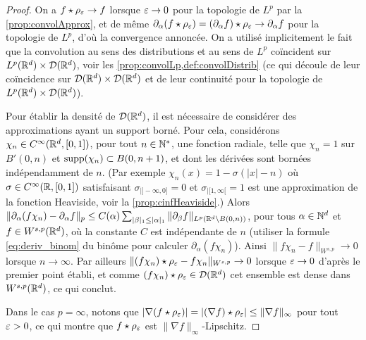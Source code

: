 \begin{proof}
	On a $f \star \rho_\varepsilon \to f$ lorsque $\varepsilon \to 0$ pour la topologie de $L^p$ par la \cref{prop:convolApprox}, et de même $\partial_\alpha (f \star \rho_\varepsilon) = (\partial_\alpha f) \star \rho_\varepsilon \to \partial_\alpha f$ pour la topologie de $L^p$, d'où la convergence annoncée. On a utilisé implicitement le fait que la convolution au sens des distributions et au sens de $L^p$ coïncident sur $L^p(\mathbb{R}^d) \times \mathcal{D}(\mathbb{R}^d)$, voir les \cref{prop:convolLp,def:convolDistrib} (ce qui découle de leur coïncidence sur $\mathcal{D}(\mathbb{R}^d)\times \mathcal{D}(\mathbb{R}^d)$ et de leur continuité pour la topologie de $L^p(\mathbb{R}^d) \times \mathcal{D}(\mathbb{R}^d)$).
	
	Pour établir la densité de $\mathcal{D}(\mathbb{R}^d)$, il est nécessaire de considérer des approximations ayant un support borné. Pour cela, considérons $\chi_n \in C^\infty (\mathbb{R}^d , [0,1])$, pour tout $n \in \mathbb{N}^*$, une fonction radiale, telle que $\chi_n = 1$ sur $B'(0,n)$ et $\operatorname{supp}(\chi_n) \subset B(0,n+1)$, et dont les dérivées sont bornées indépendamment de $n$. (Par exemple $\chi_n(x) = 1-\sigma(|x|-n)$ où $\sigma \in C^\infty( \mathbb{R} , [0,1])$ satisfaisant $\sigma_{|]-\infty,0]}=0$ et $\sigma_{|[1,\infty[} = 1$ est une approximation de la fonction Heaviside, voir la \cref{prop:cinfHeaviside}.) Alors $\|\partial_\alpha (f \chi_n) - \partial_\alpha f\|_p \leq C(\alpha) \sum_{|\beta|_1 \leq |\alpha|_1} \| \partial_\beta f\|_{L^p(\mathbb{R}^d \setminus B(0,n))}$, pour tous $\alpha \in \mathbb{N}^d$ et $f \in W^{s,p}(\mathbb{R}^d)$, où la constante $C$ est indépendante de $n$ (utiliser la formule \eqref{eq:deriv_binom} du binôme pour calculer $\partial_\alpha (f \chi_n)$). Ainsi $\|f \chi_n -  f\|_{W^{s,p}} \to 0$ lorsque $n \to \infty$. Par ailleurs $\|(f \chi_n)\star \rho_\varepsilon - f \chi_n\|_{W^{s,p}} \to 0$ lorsque $\varepsilon\to 0$ d'après le premier point établi, et comme $(f \chi_n)\star \rho_\varepsilon \in \mathcal{D}(\mathbb{R}^d)$ cet ensemble est dense dans $W^{s,p}(\mathbb{R}^d)$, ce qui conclut.
	
	
	Dans le cas $p=\infty$, notons que $|\nabla (f\star \rho_\varepsilon)| = |(\nabla f) \star \rho_\varepsilon| \leq \| \nabla f\|_\infty$  pour tout $\varepsilon>0$, ce qui montre que $f\star \rho_\varepsilon$ est $\| \nabla f\|_\infty$-Lipschitz.
\end{proof}



